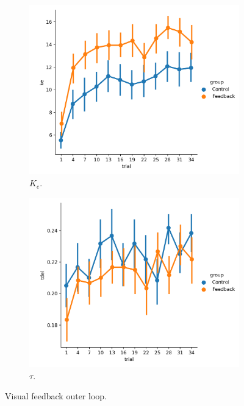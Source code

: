 \clearpage

\begin{figure}[t]
    \centering
    \begin{subfigure}[h]{0.49\textwidth}
        \centering
        \includegraphics[width=\linewidth]{figures/ke.png}
        \caption[$K_e$]{$K_e$.}
        \label{fig:sm_ke}
    \end{subfigure}
    \hfill
    \begin{subfigure}[h]{0.49\textwidth}
        \centering
        \includegraphics[width=\linewidth]{figures/tdel.png}
        \caption[$\tau$]{$\tau$.}
        \label{fig:sm_tdel}
    \end{subfigure}
    \caption[Visual feedback outer loop]{Visual feedback outer loop.}
\end{figure}

